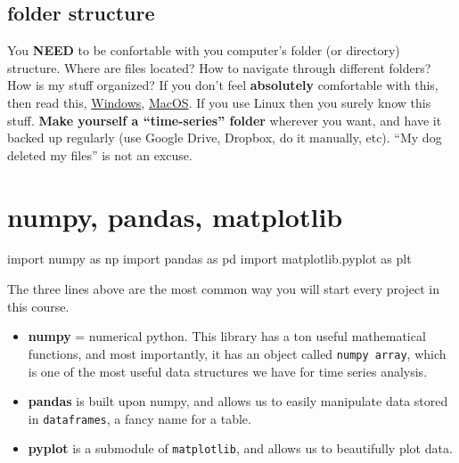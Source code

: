 \documentclass[
  letterpaper,
  DIV=11,
  numbers=noendperiod,
  oneside]{scrreprt}
\newenvironment{Shaded}{\begin{snugshade}}{\end{snugshade}}
\newcommand{\ImportTok}[1]{\textcolor[rgb]{0.00,0.46,0.62}{#1}}
\newcommand{\NormalTok}[1]{\textcolor[rgb]{0.00,0.23,0.31}{#1}}
\providecommand{\tightlist}{%
  \setlength{\itemsep}{0pt}\setlength{\parskip}{0pt}}\usepackage{longtable,booktabs,array}
\begin{document}
\hypertarget{folder-structure}{%
\section{folder structure}\label{folder-structure}}

You \textbf{NEED} to be confortable with you computer's folder (or
directory) structure. Where are files located? How to navigate through
different folders? How is my stuff organized? If you don't feel
\textbf{absolutely} comfortable with this, then read this,
\href{http://www2.westsussex.gov.uk/LearningandDevelopment/IT\%20Learning\%20Guides/Microsoft\%20Windows\%207/05\%20Working\%20with\%20folders.pdf}{Windows},
\href{https://recoverit.wondershare.com/mac-tips/mac-finder-tutorial-mac.html}{MacOS}.
If you use Linux then you surely know this stuff. \textbf{Make yourself
a ``time-series'' folder} wherever you want, and have it backed up
regularly (use Google Drive, Dropbox, do it manually, etc). ``My dog
deleted my files'' is not an excuse.

\hypertarget{numpy-pandas-matplotlib}{%
\chapter{numpy, pandas, matplotlib}\label{numpy-pandas-matplotlib}}

\begin{Shaded}
\begin{Highlighting}[]
\ImportTok{import}\NormalTok{ numpy }\ImportTok{as}\NormalTok{ np}
\ImportTok{import}\NormalTok{ pandas }\ImportTok{as}\NormalTok{ pd}
\ImportTok{import}\NormalTok{ matplotlib.pyplot }\ImportTok{as}\NormalTok{ plt}
\end{Highlighting}
\end{Shaded}

The three lines above are the most common way you will start every
project in this course.

\begin{itemize}
\tightlist
\item
  \textbf{numpy} = numerical python. This library has a ton useful
  mathematical functions, and most importantly, it has an object called
  \texttt{numpy\ array}, which is one of the most useful data structures
  we have for time series analysis.
\item
  \textbf{pandas} is built upon numpy, and allows us to easily
  manipulate data stored in \texttt{dataframes}, a fancy name for a
  table.
\item
  \textbf{pyplot} is a submodule of \texttt{matplotlib}, and allows us
  to beautifully plot data.
\end{itemize}
\end{document}
